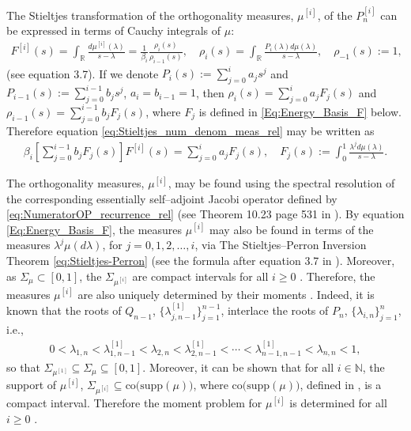 \documentclass[english,12pt]{ttuthes}
\begin{document}
The Stieltjes transformation of the orthogonality measures, $\mu^{[i]}$, of
the $P_n^{[i]}$ can be expressed in terms of Cauchy integrals of $\mu$: 
%
\begin{align}\label{eq:Stieltjes_num_denom_meas_rel}
  F^{[i]}(s)=\int_{\mathbb{R}}\frac{d\mu^{[i]}(\lambda)}{s-\lambda}=\frac{1}{\beta_i}\frac{\rho_i(s)}{\rho_{i-1}(s)},
  \quad \rho_i(s)=\int_{\mathbb{R}}\frac{P_i(\lambda)d\mu(\lambda)}{s-\lambda}, \quad \rho_{-1}(s):=1,
\end{align}
%
(see \cite{Assche:JCAM:1991:237} equation 3.7).  If we denote
$P_i(s):=\sum_{j=0}^ia_js^j$ and $P_{i-1}(s):=\sum_{j=0}^{i-1}b_js^j$,
$a_i=b_{i-1}=1$, then $\rho_i(s)=\sum_{j=0}^ia_jF_j(s)$ and
$\rho_{i-1}(s)=\sum_{j=0}^{i-1}b_jF_j(s)$, where $F_j$ is defined in
\eqref{Eq:Energy_Basis_F} below. Therefore equation
\eqref{eq:Stieltjes_num_denom_meas_rel} may be written as 
%
\begin{align}\label{Eq:Energy_Basis_F}
   \beta_i\left[\sum_{j=0}^{i-1}b_jF_j(s)\right]F^{[i]}(s)=\sum_{j=0}^ia_jF_j(s),
   \quad
   F_j(s):=\int_0^1\frac{\lambda^j d\mu(\lambda)}{s-\lambda}.
\end{align}
%

The orthogonality measures, $\mu^{[i]}$, may be found using the spectral
resolution of the corresponding essentially self--adjoint Jacobi
operator defined by \eqref{eq:NumeratorOP_recurrence_rel} (see Theorem
10.23 page 531 in \cite{Stone:64}). By equation
\eqref{Eq:Energy_Basis_F}, the measures $\mu^{[i]}$ may also be
found in terms of the measures $\lambda^j\mu(d\lambda)$, for $j=0,1,2,\ldots,i$, via The
Stieltjes--Perron Inversion Theorem \eqref{eq:Stieltjes-Perron} (see
the formula after equation 3.7 in
\cite{Assche:JCAM:1991:237}). Moreover, as $\Sigma_\mu\subset[0,1]$, the
$\Sigma_{\mu^{[i]}}$ are compact intervals for all $i\geq0$
\cite{Chihara:1978}. Therefore, the measures $\mu^{[i]}$ are also
uniquely determined by their moments \cite{Shohat:1963}. Indeed, it is
known \cite{Ismail:2005} that the roots of $Q_{n-1}$,
$\{\lambda_{j,n-1}^{[1]}\}_{j=1}^{n-1}$, interlace the roots of $P_n$,
$\{\lambda_{i,n}\}_{j=1}^{n}$, i.e., 
% 
\begin{align}\label{eq:InterlaceQP}
  0<\lambda_{1,n}<\lambda_{1,n-1}^{[1]}<\lambda_{2,n}<\lambda_{2,n-1}^{[1]}<\cdots<\lambda_{n-1,n-1}^{[1]}<\lambda_{n,n}<1,
\end{align}
%
so that $\Sigma_{\mu^{[1]}}\subseteq\Sigma_\mu\subseteq[0,1]$. Moreover, it can be shown that for
all $i\in\mathbb{N}$, the support of $\mu^{[i]}$,
$\Sigma_{\mu^{[i]}}\subseteq\text{co(supp}(\mu))$, where $\text{co(supp}(\mu))$, defined  
in \cite{Chihara:1978}, is a compact interval. Therefore the moment
problem for $\mu^{[i]}$ is determined for all $i\geq0$ \cite{Shohat:1963}. 
\end{document}
